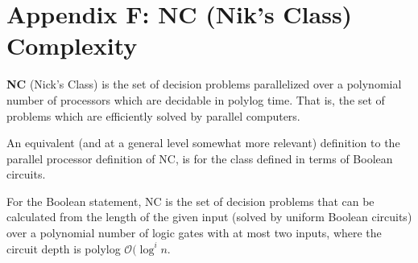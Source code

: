 \section*{Appendix F: NC (Nik's Class) Complexity}

\textbf{NC} (Nick's Class) is the set of decision problems parallelized over a polynomial number of processors which are decidable in polylog time. That is, the set of problems which are efficiently solved by parallel computers. 

An equivalent (and at a general level somewhat more relevant) definition to the parallel processor definition of NC, is for the class defined in terms of Boolean circuits. 

For the Boolean statement, NC is the set of decision problems that can be calculated from the length of the given input (solved by uniform Boolean circuits) over a polynomial number of logic gates with at most two inputs, where the circuit depth is polylog $\mathcal{O}(\log^{i}{n}$.